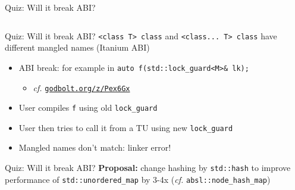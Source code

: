 \begin{frame}[fragile]{Quiz: Will it break ABI?}
    \begin{columns}[t]
        \begin{column}{.4\textwidth}
        \end{column}
        \begin{column}{.5\textwidth}
        \end{column}
    \end{columns}
\end{frame}

\begin{frame}[fragile]{Quiz: Will it break ABI?}
    \texttt{<class T> class} and \texttt{<class... T> class} have different mangled names (Itanium ABI)
    \begin{itemize}
        \item \textcolor{vertexDarkRed}{ABI break:} for example in \texttt{auto f(std::lock\_guard<M>\& lk);}
        \begin{itemize}
            \item \textit{cf.} \href{https://godbolt.org/z/Pex6Gx}{\texttt{godbolt.org/z/Pex6Gx}}
        \end{itemize}
        \item User compiles \texttt{f} using old \texttt{lock\_guard}
        \item User then tries to call it from a TU using new \texttt{lock\_guard}
        \item Mangled names don't match: linker error!
    \end{itemize}
\end{frame}

\begin{frame}{Quiz: Will it break ABI?}
    \textbf{Proposal:} change hashing by \texttt{std::hash} to improve performance of \texttt{std::unordered\_map} by 3-4x (\textit{cf.} \texttt{absl::node\_hash\_map})

    \vspace*{5mm}

\end{frame}

